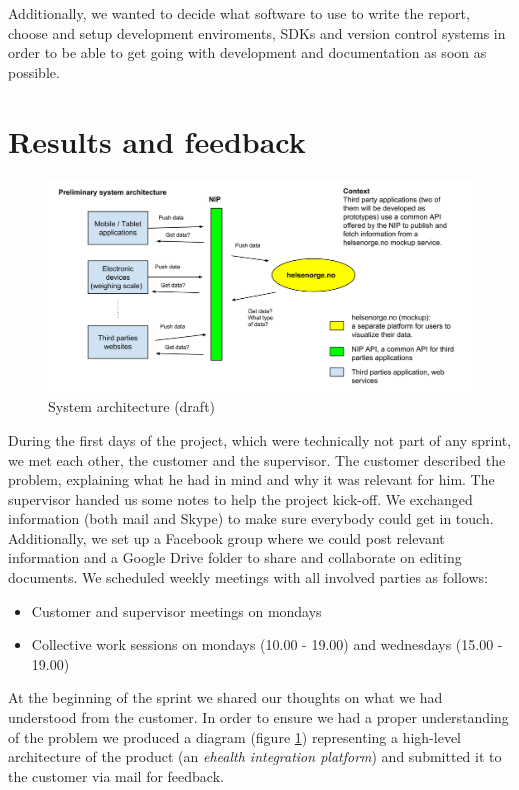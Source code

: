 Additionally, we wanted to decide what software to use to write the report, choose and setup development enviroments, SDKs and version control systems in order to be able to get going with development and documentation as soon as possible.


\section{Results and feedback}

\begin{figure}[h]
\centering
\includegraphics[scale=0.30]{../Figures/architecture-draft.png}
\caption{System architecture (draft)}
\label{figure:architecture-draft}
\end{figure}

During the first days of the project, which were technically not part of any sprint, we met each other, the customer and the supervisor.
The customer described the problem, explaining what he had in mind and why it was relevant for him.
The supervisor handed us some notes to help the project kick-off.
We exchanged information (both mail and Skype) to make sure everybody could get in touch. 
Additionally, we set up a Facebook group where we could post relevant information and a Google Drive folder to share and collaborate on editing documents.
We scheduled weekly meetings with all involved parties as follows:
\begin{itemize}
\item Customer and supervisor meetings on mondays
\item Collective work sessions on mondays (10.00 - 19.00) and wednesdays (15.00 - 19.00)
\end{itemize}

At the beginning of the sprint we shared our thoughts on what we had understood from the customer.
In order to ensure we had a proper understanding of the problem we produced a diagram (figure \ref{figure:architecture-draft}) representing a high-level architecture of the product (an \textit{ehealth integration platform}) and submitted it to the customer via mail for feedback.

